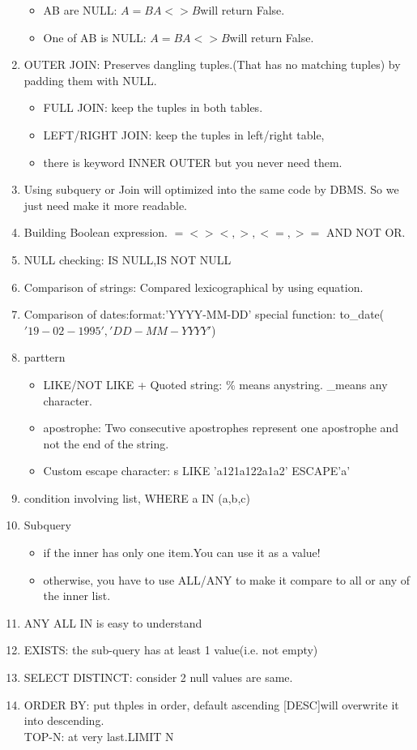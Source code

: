 \begin{enumerate}
\begin{itemize}
        \item AB are NULL: $A=B A<>B$will return False.
        \item One of AB is NULL: $A=B A<>B$will return False.
    \end{itemize}
    \item OUTER JOIN: Preserves dangling tuples.(That has no matching tuples) by padding them with NULL.
    \begin{itemize}
        \item FULL JOIN: keep the tuples in both tables.
        \item LEFT/RIGHT JOIN: keep the tuples in left/right table,
        \item there is keyword INNER OUTER but you never need them.
    \end{itemize}
    \item Using subquery or Join will optimized into the same code by DBMS. So we just need make it more readable.
    \item Building Boolean expression. $= <> < ,> ,<= , >=$ AND NOT OR.
    \item NULL checking: IS NULL,IS NOT NULL
    \item Comparison of strings: Compared lexicographical by using equation.
    \item Comparison of dates:format:'YYYY-MM-DD'
    special function: to\_date($'19-02-1995','DD-MM-YYYY'$)
    \item parttern\begin{itemize}
        \item LIKE/NOT LIKE + Quoted string: \% means anystring. \_means any character.
        \item apostrophe: Two consecutive apostrophes represent one apostrophe and not the end of the string.
        \item Custom escape character: s LIKE 'a121a122a1a2' ESCAPE'a'
    \end{itemize}
    \item condition involving list, WHERE a IN (a,b,c)
    \item Subquery\begin{itemize}
        \item if the inner has only one item.You can use it as a value!
        \item otherwise, you have to use ALL/ANY to make it compare to all or any of the inner list.
    \end{itemize}
    \item ANY ALL IN is easy to understand
    \item EXISTS: the sub-query has at least 1 value(i.e. not empty)
    \item SELECT DISTINCT: consider 2 null values are same.
    \item ORDER BY: put thples in order, default ascending [DESC]will overwrite it into descending.\\TOP-N: at very last.LIMIT N
\end{enumerate}